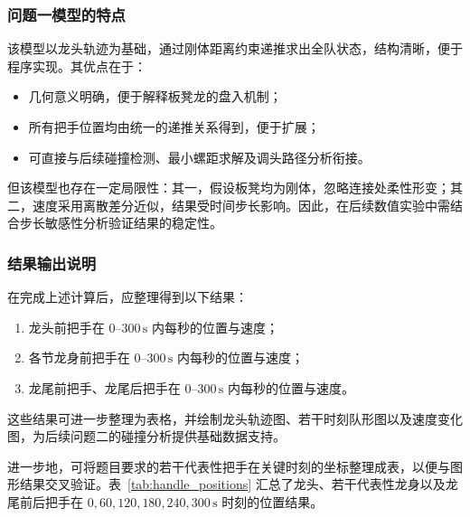 \documentclass[12pt,a4paper]{ctexart}
\begin{document}
\subsubsection{问题一模型的特点}
该模型以龙头轨迹为基础，通过刚体距离约束递推求出全队状态，结构清晰，便于程序实现。其优点在于：
\begin{itemize}
    \item 几何意义明确，便于解释板凳龙的盘入机制；
    \item 所有把手位置均由统一的递推关系得到，便于扩展；
    \item 可直接与后续碰撞检测、最小螺距求解及调头路径分析衔接。
\end{itemize}

但该模型也存在一定局限性：其一，假设板凳均为刚体，忽略连接处柔性形变；其二，速度采用离散差分近似，结果受时间步长影响。因此，在后续数值实验中需结合步长敏感性分析验证结果的稳定性。

\subsubsection{结果输出说明}
在完成上述计算后，应整理得到以下结果：
\begin{enumerate}
    \item 龙头前把手在 $0$--$300\,\mathrm{s}$ 内每秒的位置与速度；
    \item 各节龙身前把手在 $0$--$300\,\mathrm{s}$ 内每秒的位置与速度；
    \item 龙尾前把手、龙尾后把手在 $0$--$300\,\mathrm{s}$ 内每秒的位置与速度。
\end{enumerate}

\noindent 这些结果可进一步整理为表格，并绘制龙头轨迹图、若干时刻队形图以及速度变化图，为后续问题二的碰撞分析提供基础数据支持。

进一步地，可将题目要求的若干代表性把手在关键时刻的坐标整理成表，以便与图形结果交叉验证。表~\ref{tab:handle_positions} 汇总了龙头、若干代表性龙身以及龙尾前后把手在 $0,60,120,180,240,300\,\mathrm{s}$ 时刻的位置结果。
\end{document}
